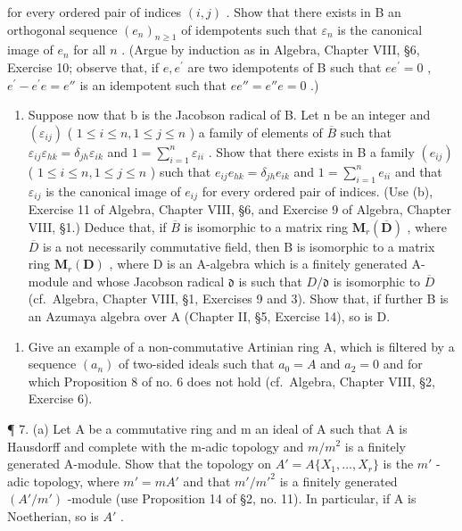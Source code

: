 for every ordered pair of indices \((i,j)\) . Show that there exists in B an orthogonal sequence \((e_n)_{n\geq 1}\) of idempotents such that \(\varepsilon_{n}\) is the canonical image of \(e_n\) for all \(n\) . (Argue by induction as in Algebra, Chapter VIII, §6, Exercise 10; observe that, if \(e,e^{\prime}\) are two idempotents of B such that \(ee^{\prime} = 0\) , \(e^{\prime} - e^{\prime}e = e''\) is an idempotent such that \(ee'' = e''e = 0\) .)

\begin{enumerate}
\def\labelenumi{(\alph{enumi})}
\setcounter{enumi}{2}
\tightlist
\item
  Suppose now that b is the Jacobson radical of B. Let n be an integer and \((\varepsilon_{ij})\) ( \(1 \leqslant i \leqslant n, 1 \leqslant j \leqslant n\) ) a family of elements of \(\overline{B}\) such that \(\varepsilon_{ij}\varepsilon_{hk} = \delta_{jh}\varepsilon_{ik}\) and \(1 = \sum_{i=1}^{n} \varepsilon_{ii}\) . Show that there exists in B a family \((e_{ij})\) ( \(1 \leqslant i \leqslant n, 1 \leqslant j \leqslant n\) ) such that \(e_{ij}e_{hk} = \delta_{jh}e_{ik}\) and \(1 = \sum_{i=1}^{n} e_{ii}\) and that \(\varepsilon_{ij}\) is the canonical image of \(e_{ij}\) for every ordered pair of indices. (Use (b), Exercise 11 of Algebra, Chapter VIII, §6, and Exercise 9 of Algebra, Chapter VIII, §1.) Deduce that, if \(\overline{B}\) is isomorphic to a matrix ring \(\mathbf{M}_{r}(\overline{\mathbf{D}})\) , where \(\overline{D}\) is a not necessarily commutative field, then B is isomorphic to a matrix ring \(\mathbf{M}_{r}(\mathbf{D})\) , where D is an A-algebra which is a finitely generated A-module and whose Jacobson radical \(\mathfrak{d}\) is such that \(D/\mathfrak{d}\) is isomorphic to \(\overline{D}\) (cf.~Algebra, Chapter VIII, §1, Exercises 9 and 3). Show that, if further B is an Azumaya algebra over A (Chapter II, §5, Exercise 14), so is D.
\end{enumerate}

\begin{enumerate}
\def\labelenumi{\arabic{enumi}.}
\setcounter{enumi}{5}
\tightlist
\item
  Give an example of a non-commutative Artinian ring A, which is filtered by a sequence \((a_{n})\) of two-sided ideals such that \(a_{0} = A\) and \(a_{2} = 0\) and for which Proposition 8 of no. 6 does not hold (cf.~Algebra, Chapter VIII, §2, Exercise 6).
\end{enumerate}

¶ 7. (a) Let A be a commutative ring and m an ideal of A such that A is Hausdorff and complete with the m-adic topology and \(m/m^{2}\) is a finitely generated A-module. Show that the topology on \(A' = A\{X_{1}, \ldots, X_{r}\}\) is the \(m'\) -adic topology, where \(m' = mA'\) and that \(m'/m'^{2}\) is a finitely generated \((A'/m')\) -module (use Proposition 14 of §2, no. 11). In particular, if A is Noetherian, so is \(A'\) .

